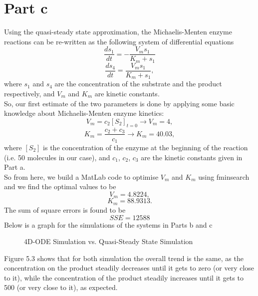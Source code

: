 \section{Part c}
Using the quasi-steady state approximation, the Michaelis-Menten enzyme reactions can be re-written as the following system of differential equations
$$
\frac{ds_{1}}{dt} = - \frac{V_{m}s_{1}}{K_{m}+s_{1}}
$$
$$
\frac{ds_{4}}{dt} = \frac{V_{m}s_{1}}{K_{m}+s_{1}},
$$
where $s_{1}$ and $s_{4}$ are the concentration of the substrate and the product respectively, and $V_{m}$ and $K_{m}$ are kinetic constants.\\
So, our first estimate of the two parameters is done by applying some basic knowledge about Michaelis-Menten enzyme kinetics:
$$
V_{m} = c_{2}[S_{2}]_{t=0} \rightarrow  V_{m} = 4,
$$
$$
K_{m} = \frac{c_{2}+c_{3}}{c_{1}} \rightarrow K_{m} = 40.03,
$$
where $[S_{2}]$ is the concentration of the enzyme at the beginning of the reaction (i.e. 50 molecules in our case), and $c_{1}$, $c_{2}$, $c_{3}$ are the kinetic constants given in Part a.\\
So from here, we build a MatLab code to optimise $V_{m}$ and $K_{m}$ using fminsearch and we find the optimal values to be
$$
V_{m} = 4.8224,
$$
$$
K_{m} = 88.9313.
$$
The sum of square errors is found to be
$$
SSE =  12588
$$
Below is a graph for the simulations of the systems in Parts b and c 
\begin{figure}[H]
	\caption{4D-ODE Simulation vs. Quasi-Steady State Simulation }
\end{figure}
Figure 5.3 shows that for both simulation the overall trend is the same, as the concentration on the product steadily decreases until it gets to zero (or very close to it), while the concentration of the product steadily increases until it gets to 500 (or very close to it), as expected.\\
